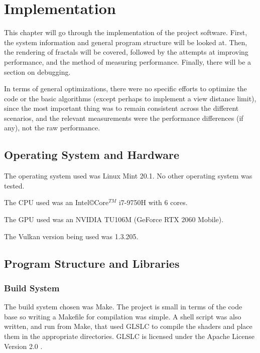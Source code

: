 \chapter{Implementation}
\label{chapter:implementation}

This chapter will go through the implementation of the project software. First, the system information and general program structure will be looked at. Then, the rendering of fractals will be covered, followed by the attempts at improving performance, and the method of measuring performance. Finally, there will be a section on debugging.\newline

In terms of general optimizations, there were no specific efforts to optimize the code or the basic algorithms (except perhaps to implement a view distance limit), since the most important thing was to remain consistent across the different scenarios, and the relevant measurements were the performance differences (if any), not the raw performance.

\section{Operating System and Hardware}

The operating system used was Linux Mint 20.1. No other operating system was tested.\newline

The CPU used was an Intel\copyright Core$^{TM}$ i7-9750H with 6 cores.

The GPU used was an NVIDIA TU106M (GeForce RTX 2060 Mobile).

The Vulkan version being used was 1.3.205.

\section{Program Structure and Libraries}

\subsection{Build System}

The build system chosen was Make. The project is small in terms of the code base so writing a Makefile for compilation was simple. A shell script was also written, and run from Make, that used GLSLC to compile the shaders and place them in the appropriate directories. GLSLC is licensed under the Apache License Version 2.0 \cite{licensing-glslc}.

